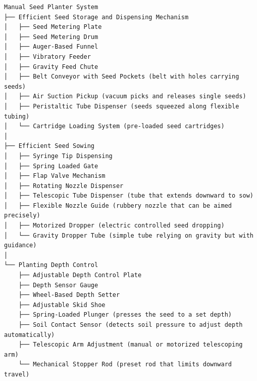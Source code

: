 
\begin{center}
\begin{verbatim}
Manual Seed Planter System
├── Efficient Seed Storage and Dispensing Mechanism
│   ├── Seed Metering Plate
│   ├── Seed Metering Drum
│   ├── Auger-Based Funnel
│   ├── Vibratory Feeder
│   ├── Gravity Feed Chute
│   ├── Belt Conveyor with Seed Pockets (belt with holes carrying seeds)
│   ├── Air Suction Pickup (vacuum picks and releases single seeds)
│   ├── Peristaltic Tube Dispenser (seeds squeezed along flexible tubing)
│   └── Cartridge Loading System (pre-loaded seed cartridges)
│
├── Efficient Seed Sowing
│   ├── Syringe Tip Dispensing
│   ├── Spring Loaded Gate
│   ├── Flap Valve Mechanism
│   ├── Rotating Nozzle Dispenser
│   ├── Telescopic Tube Dispenser (tube that extends downward to sow)
│   ├── Flexible Nozzle Guide (rubbery nozzle that can be aimed precisely)
│   ├── Motorized Dropper (electric controlled seed dropping)
│   └── Gravity Dropper Tube (simple tube relying on gravity but with guidance)
│
└── Planting Depth Control
    ├── Adjustable Depth Control Plate
    ├── Depth Sensor Gauge
    ├── Wheel-Based Depth Setter
    ├── Adjustable Skid Shoe
    ├── Spring-Loaded Plunger (presses the seed to a set depth)
    ├── Soil Contact Sensor (detects soil pressure to adjust depth automatically)
    ├── Telescopic Arm Adjustment (manual or motorized telescoping arm)
    └── Mechanical Stopper Rod (preset rod that limits downward travel)
\end{verbatim}
  \label{lst:seedPlanter}
\end{center}
